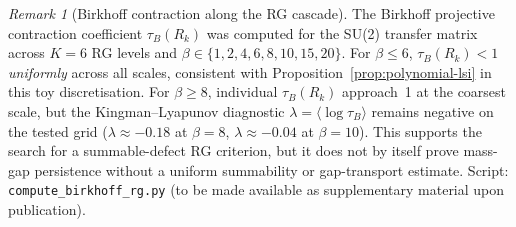 \documentclass[12pt,a4paper]{article}
\theoremstyle{definition}
\theoremstyle{plain}
\theoremstyle{remark}
\newtheorem{remark}[definition]{Remark}
\begin{document}
\begin{remark}[Birkhoff contraction along the RG cascade]
\label{rem:birkhoff-numerics}
The Birkhoff projective contraction coefficient $\tau_B(R_k)$ was computed for the SU(2) transfer matrix across $K=6$ RG levels and $\beta \in \{1, 2, 4, 6, 8, 10, 15, 20\}$. For $\beta \leq 6$, $\tau_B(R_k) < 1$ \emph{uniformly} across all scales, consistent with Proposition~\ref{prop:polynomial-lsi} in this toy discretisation. For $\beta \geq 8$, individual $\tau_B(R_k)$ approach~1 at the coarsest scale, but the Kingman--Lyapunov diagnostic $\lambda = \langle \log \tau_B \rangle$ remains negative on the tested grid ($\lambda \approx -0.18$ at $\beta=8$, $\lambda \approx -0.04$ at $\beta=10$). This supports the search for a summable-defect RG criterion, but it does not by itself prove mass-gap persistence without a uniform summability or gap-transport estimate. Script: \texttt{compute\_birkhoff\_rg.py} (to be made available as supplementary material upon publication).
\end{remark}

\end{document}

